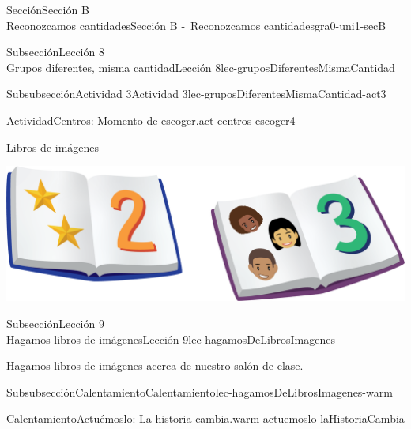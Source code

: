 \begin{sectionptx}{Sección}{{\Large Sección B\\}Reconozcamos cantidades}{}{Sección B -~Reconozcamos cantidades}{}{}{gra0-uni1-secB}
\begin{subsectionptx}{Subsección}{{\normalsize Lección 8\\[-0.05cm]}Grupos diferentes, misma cantidad}{}{Lección 8}{}{}{lec-gruposDiferentesMismaCantidad}
\begin{subsubsectionptx}{Subsubsección}{Actividad 3}{}{Actividad 3}{}{}{lec-gruposDiferentesMismaCantidad-act3}
\begin{activity}{Actividad}{Centros: Momento de escoger.}{act-centros-escoger4}
\begin{sidebyside}{2}{0.025}{0.025}{0.05}
\begin{sbspanel}{0.45}
\end{sbspanel}%
\begin{sbspanel}{0.45}%
Libros de imágenes%
\par
\includegraphics[max width=\linewidth, center]{external/png-source/K.1.D Beta Student Workbooks.Books.png}
\end{sbspanel}%
\end{sidebyside}%
\end{activity}%
\end{subsubsectionptx}
\end{subsectionptx}
%
%
\typeout{************************************************}
\typeout{************************************************}
%
\begin{subsectionptx}{Subsección}{{\normalsize Lección 9\\[-0.05cm]}Hagamos libros de imágenes}{}{Lección 9}{}{}{lec-hagamosDeLibrosImagenes}
\begin{introduction}{}%
Hagamos libros de imágenes acerca de nuestro salón de clase.%
\end{introduction}%
%
%
\typeout{************************************************}
\typeout{************************************************}
%
\begin{subsubsectionptx}{Subsubsección}{Calentamiento}{}{Calentamiento}{}{}{lec-hagamosDeLibrosImagenes-warm}
\begin{exploration}{Calentamiento}{Actuémoslo: La historia cambia.}{warm-actuemoslo-laHistoriaCambia}%
\begin{image}{0.0}{1}{0.0}{}%

\end{image}
\end{exploration}
\end{subsubsectionptx}
\end{subsectionptx}
\end{sectionptx}
